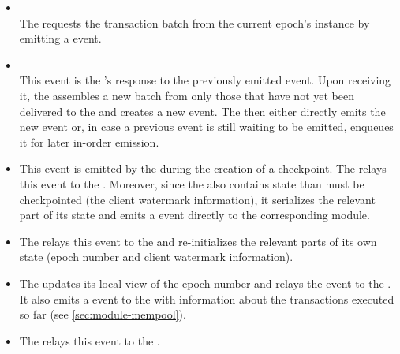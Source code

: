 \documentclass{article}
\begin{document}
\begin{itemize}

    \item {}\\
    The  requests the transaction batch from the current epoch's  instance
    by emitting a  event.

    \item {}\\
    This event is the 's response to the previously emitted  event.
    Upon receiving it, the  assembles a new batch from only those 
    that have not yet been delivered to the  and creates a new  event.
    The  then either directly emits the new  event
    or, in case a previous event is still waiting to be emitted, enqueues it for later in-order emission.

    \item {}
    This event is emitted by the  during the creation of a checkpoint.
    The  relays this event to the .
    Moreover, since the  also contains state than must be checkpointed (the client watermark information),
    it serializes the relevant part of its state and emits a  event directly to the corresponding  module.

    \item {}
    The  relays this event to the  and re-initializes the relevant parts of its own state
    (epoch number and client watermark information).

    \item {}
    The  updates its local view of the epoch number and relays the event to the .
    It also emits a  event to the  with information about the transactions executed so far (see \cref{sec:module-mempool}).
    
    \item {}
    The  relays this event to the .

\end{itemize}
\end{document}
